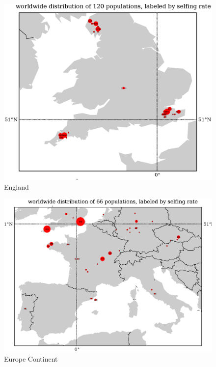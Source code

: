 \documentclass[a4paper,10pt]{article}
\begin{document}
\begin{figure}
\includegraphics[width=1\textwidth]{figures/s0829popid2ecotypeid_5_Eng__7_49_2_55_l3y1_pop_map.eps}
\caption{England}\label{f10}
\end{figure}


\begin{figure}
\includegraphics[width=1\textwidth]{figures/s0829popid2ecotypeid_25_EurCont__10_35_20_53_l3y1_pop_map.eps}
\caption{Europe Continent}\label{f15}
\end{figure}
\end{document}
